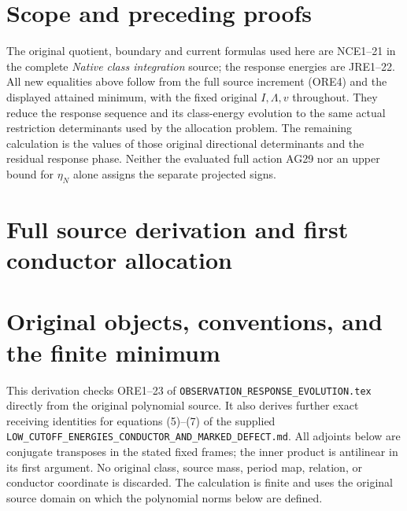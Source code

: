 \documentclass[11pt,a4paper]{article}
\providecommand{\diag}{\operatorname{diag}}
\providecommand{\norm}[1]{\left\lVert#1\right\rVert}
\begin{document}
\section{Scope and preceding proofs}
The original quotient, boundary and current formulas used here are
NCE1--21 in the complete \emph{Native class integration} source;
the response energies are JRE1--22. All new equalities above follow
from the full source increment (ORE4) and the displayed attained
minimum, with the fixed original $I,\Lambda,v$ throughout.
They reduce the response sequence and its class-energy evolution to
the same actual restriction determinants used by the allocation
problem. The remaining calculation is the values of those original
directional determinants and the residual response phase. Neither
the evaluated full action AG29 nor an upper bound for $\eta_N$ alone
assigns the separate projected signs.



\endgroup

\clearpage
\begingroup
\def\C{\mathbb C}
\def\R{\mathbb R}
\def\im{\operatorname{im}}
\def\lc{\operatorname{lc}}
\def\diag{\operatorname{diag}}
\def\norm#1{\left\lVert#1\right\rVert}

\setcounter{equation}{0}
\renewcommand{\theequation}{A04OID.\arabic{equation}}
\section*{Full source derivation and first conductor allocation}


\section{Original objects, conventions, and the finite minimum}

This derivation checks ORE1--23 of
\texttt{OBSERVATION\_RESPONSE\_EVOLUTION.tex} directly from the
original polynomial source. It also derives further exact receiving
identities for equations (5)--(7) of the supplied
\texttt{LOW\_CUTOFF\_ENERGIES\_CONDUCTOR\_AND\_MARKED\_DEFECT.md}.
All adjoints below are conjugate transposes in the stated fixed frames;
the inner product is antilinear in its first argument. No original
class, source mass, period map, relation, or conductor coordinate is
discarded. The calculation is finite and uses the original source
domain on which the polynomial norms below are defined.
\end{document}

